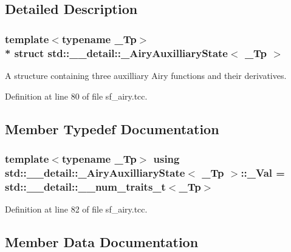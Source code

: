 \subsection{Detailed Description}
\subsubsection*{template$<$typename \+\_\+\+Tp$>$\\*
struct std\+::\+\_\+\+\_\+detail\+::\+\_\+\+Airy\+Auxilliary\+State$<$ \+\_\+\+Tp $>$}

A structure containing three auxilliary Airy functions and their derivatives. 

Definition at line 80 of file sf\+\_\+airy.\+tcc.



\subsection{Member Typedef Documentation}
\subsubsection[{\texorpdfstring{\+\_\+\+Val}{_Val}}]{\setlength{\rightskip}{0pt plus 5cm}template$<$typename \+\_\+\+Tp$>$ using {\bf std\+::\+\_\+\+\_\+detail\+::\+\_\+\+Airy\+Auxilliary\+State}$<$ \+\_\+\+Tp $>$\+::{\bf \+\_\+\+Val} =  std\+::\+\_\+\+\_\+detail\+::\+\_\+\+\_\+num\+\_\+traits\+\_\+t$<$\+\_\+\+Tp$>$}\hypertarget{structstd_1_1____detail_1_1__AiryAuxilliaryState_a5f44a95a23b7c60f0b748df5f7f24f26}{}\label{structstd_1_1____detail_1_1__AiryAuxilliaryState_a5f44a95a23b7c60f0b748df5f7f24f26}


Definition at line 82 of file sf\+\_\+airy.\+tcc.



\subsection{Member Data Documentation}
